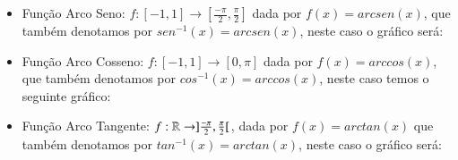 \begin{itemize}
  Já no gráfico da função cotangente vemos a repetição do comportamento do intervalo $]0, \pi[$, e temos que
  \[cotan(x + \pi)= cotan(x)\]
  portanto esta é uma função periódica de período $\pi$.

  \textbf{Funções Inversas}
  
  As funções trigonométricas admitem inversas quando restringimos seus domínios a um único período da função, assim temos por exemplo as seguintes funções:
  
  \item Função Arco Seno: $f: [-1, 1] \rightarrow [\frac{-\pi}{2}, \frac{\pi}{2}]$ dada por $f(x)= arcsen(x)$, que também denotamos por $sen^{-1}(x)= arcsen (x)$, neste caso o gráfico será:


  \item Função Arco Cosseno: $f: [-1, 1] \rightarrow [0, \pi]$ dada por $f(x)= arccos(x)$, que também denotamos por $cos^{-1}(x)= arccos (x)$, neste caso temos o seguinte gráfico:


  \item Função Arco Tangente: $f: \mathbb{R} \rightarrow ]\frac{-\pi}{2}, \frac{\pi}{2}[$, dada por $f(x)= arctan(x)$ que também denotamos por $tan^{-1}(x)= arctan (x)$, neste caso o gráfico será:


\end{itemize}
